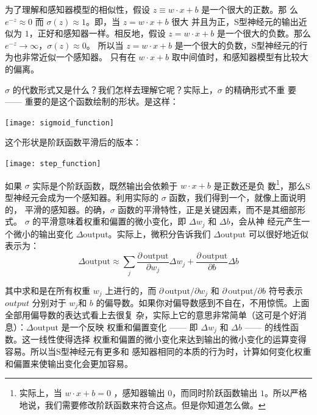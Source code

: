 为了理解和感知器模型的相似性，假设 $z \equiv w \cdot x + b$ 是一个很大的正数。那
么 $e^{-z} \approx 0$ 而 $\sigma(z) \approx 1$。即，当 $z = w \cdot x+b$ 很大
并且为正，S型神经元的输出近似为 $1$，正好和感知器一样。相反地，假设 $z = w \cdot
x+b$ 是一个很大的负数。那么 $e^{-z} \rightarrow \infty$，$\sigma(z) \approx 0$。
所以当 $z = w \cdot x +b$ 是一个很大的负数，S型神经元的行为也非常近似一个感知器。
只有在 $w \cdot x+b$ 取中间值时，和感知器模型有比较大的偏离。

$\sigma$ 的代数形式又是什么？我们怎样去理解它呢？实际上，$\sigma$ 的精确形式不重
要 —— 重要的是这个函数绘制的形状。是这样：
\begin{center}
  \texttt{[image: sigmoid\_function]}
  \label{fig:SigmoidFunction}
\end{center}

这个形状是阶跃函数平滑后的版本：
\begin{center}
  \texttt{[image: step\_function]}
  \label{fig:StepFunction}
\end{center}

如果 $\sigma$ 实际是个阶跃函数，既然输出会依赖于 $w\cdot x+b$ 是正数还是负
数\footnote{实际上，当 $w \cdot x +b = 0$ ，感知器输出 $0$，而同时阶跃函数输出
  $1$。所以严格地说，我们需要修改阶跃函数来符合这点。但是你知道怎么做。}，那么S
型神经元会成为一个感知器。利用实际的 $\sigma$ 函数，我们得到一个，就像上面说明的，
平滑的感知器。的确，$\sigma$ 函数的平滑特性，正是关键因素，而不是其细部形式。
$\sigma$ 的平滑意味着权重和偏置的微小变化，即 $\Delta w_j$ 和 $\Delta b$，会从神
经元产生一个微小的输出变化 $\Delta \mbox{output}$。实际上，微积分告诉我们
$\Delta \mbox{output}$ 可以很好地近似表示为：
\begin{equation}
  \Delta \mbox{output} \approx \sum_j \frac{\partial \, \mbox{output}}{\partial w_j}
  \Delta w_j + \frac{\partial \, \mbox{output}}{\partial b} \Delta b
  \label{eq:5}\tag{5}
\end{equation}

其中求和是在所有权重 $w_j$ 上进行的，而 $\partial \, \mbox{output} / \partial w_j$ 和
$\partial \, \mbox{output} /\partial b$ 符号表示 $output$ 分别对于 $w_j$和 $b$
的偏导数。如果你对偏导数感到不自在，不用惊慌。上面全部用偏导数的表达式看上去很复
杂，实际上它的意思非常简单（这可是个好消息）：$\Delta \mbox{output}$ 是一个反映
权重和偏置变化 —— 即 $\Delta w_j$ 和 $\Delta b$ —— 的线性函数。这一线性使得选择
权重和偏置的微小变化来达到输出的微小变化的运算变得容易。所以当S型神经元有更多和
感知器相同的本质的行为时，计算如何变化权重和偏置来使输出变化会更加容易。

